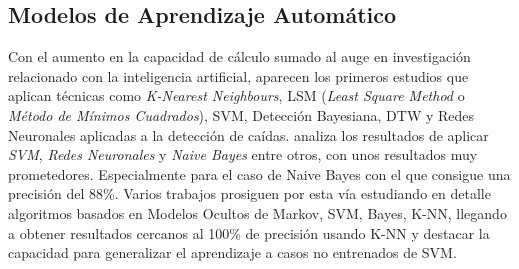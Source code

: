 \begin{comment}

Sobre cálculos basados en cotas, tenemos \cite{fallindex00}, Kangas\cite{Kangas2008} lo compara con el uso ya sea de aceleración vertical o modulo de la aceleración y de nuevo obtiene resultados dispares según el tipo de caída simulada.

\todohide{
1- Monitorizado básico (usar módulo del vector aceleración y un threshold X )
2- Fall Index (Yoshida,  T.;  Mizuno,  F.;  Hayasaka,  T.;  Tsubota,  K.;  Wada,  S.;  Yamaguchi,  T.  A  Wearable  Computer System for a Detection and Prevention of Elderly Users from Falling. In Proceedings of  the  12th  International  Conference  on  Biomedical  and  Medical  Engineering  (ICBME),  Singapore, Singapore, 7–10 December 2005.  )
3- PerFallD (Dai, J.; Bai, X.; Yang, Z.; Shen, Z.; Xuan, D. PerFallD: A Pervasive Fall Detection System using Mobile   Phones.   In   Proceedings   of   the   8th   IEEE   International   Conference   on   Pervasive   Computing  and  Communications  Workshops  (PERCOM  Workshops),  Mannheim,  Germany,    29 March–2 April 2010; pp. 292–297) (usa también un giroscopio)
4- iFall (Sposaro,  F.;  Tyson,  G.  IFall:  An  Android  Application  for  Fall  Monitoring  and  Response.    In Proceedings of the Annual International Conference of the IEEE Engineering in Medicine and Biology Society (EMBC 2009), Minneapolis, MN, USA, 2–6 September 2009; pp. 6119–6122. )}

\end{comment}


\subsection{Modelos de Aprendizaje Automático}\label{sec:arte:modelos_ml}

Con el aumento en la capacidad de cálculo sumado al auge en investigación relacionado con la inteligencia artificial, aparecen los primeros estudios que aplican técnicas como \textit{K-Nearest Neighbours}, LSM (\textit{Least Square Method} o \textit{Método de Mínimos Cuadrados}), SVM, Detección Bayesiana, DTW y Redes Neuronales aplicadas a la detección de caídas.  analiza los resultados de aplicar \textit{SVM}, \textit{Redes Neuronales} y \textit{Naive Bayes} entre otros, con unos resultados muy prometedores. Especialmente para el caso de Naive Bayes con el que consigue una precisión del 88\%. Varios trabajos \cite{Luque2014,ReyesOrtiz2014,tfall,Ozdemir2014} prosiguen por esta vía estudiando en detalle algoritmos basados en Modelos Ocultos de Markov, SVM, Bayes, K-NN, llegando a obtener resultados cercanos al 100\% de precisión usando K-NN \cite{Ozdemir2014} y destacar la capacidad para generalizar el aprendizaje a casos no entrenados de SVM\cite{tfall, Aziz2017b}.

